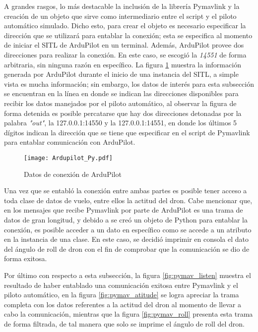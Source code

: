 A grandes rasgos, lo más destacable la inclusión de la librería Pymavlink y la creación de un objeto que sirve como intermediario entre el script y el piloto automático simulado. Dicho esto, para crear el objeto es necesario especificar la dirección que se utilizará para entablar la conexión; esta se especifica al momento de iniciar el SITL de ArduPilot en un terminal. Además, ArduPilot provee dos direcciones para realizar la conexión. En este caso, se escogió la \textit{14551} de forma arbitraria, sin ninguna razón en específico. La figura \ref{fig:Ardupilot_Py} muestra la información generada por ArduPilot durante el inicio de una instancia del SITL, a simple vista es mucha información; sin embargo, los datos de interés para esta subsección se encuentran en la línea en donde se indican las direcciones disponibles para recibir los datos manejados por el piloto automático, al observar la figura de forma detenida es posible percatarse que hay dos direcciones detonadas por la palabra \textit{"out"}, la 127.0.0.1:14550 y la 127.0.0.1:14551, en donde los últimos 5 dígitos indican la dirección que se tiene que especificar en el script de Pymavlink para entablar comunicación con ArduPilot. 

\begin{figure}[ht]
    \centering
    \texttt{[image: Ardupilot\_Py.pdf]}
    \caption{Datos de conexión de ArduPilot}
    \label{fig:Ardupilot_Py}
\end{figure}

Una vez que se entabló la conexión entre ambas partes es posible tener acceso a toda clase de datos de vuelo, entre ellos la actitud del dron. Cabe mencionar que, en los mensajes que recibe Pymavlink por parte de ArduPilot es una trama de datos de gran longitud, y debido a se creó un objeto de Python para entablar la conexión, es posible acceder a un dato en específico como se accede a un atributo en la instancia de una clase. En este caso, se decidió imprimir en consola el dato del ángulo de roll de dron con el fin de comprobar que la comunicación se dio de forma exitosa. 

Por último con respecto a esta subsección, la figura \ref{fig:pymav_listen} muestra el resultado de haber entablado una comunicación exitosa entre Pymavlink y el piloto automático, en la figura \ref{fig:pymav_atitude} se logra apreciar la trama completa con los datos referentes a la actitud del dron al momento de llevar a cabo la comunicación, mientras que la figura \ref{fig:pymav_roll} presenta esta trama de forma filtrada, de tal manera que solo se imprime el ángulo de roll del dron.
 

